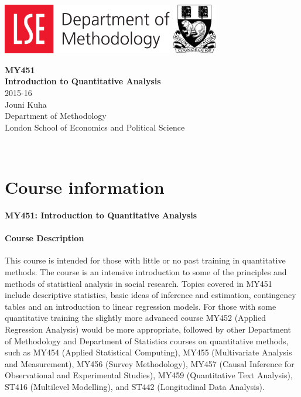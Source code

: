 \frontmatter
\thispagestyle{empty}

\includegraphics[height=2.2cm]{dept_of_methodology}
\hfill
\includegraphics[height=2.2cm]{lse}


\begin{center}
{\LARGE \textbf{MY451}}\\{\LARGE \textbf{Introduction to Quantitative Analysis}}
\\
{\Large 2015-16}\\
{\Large Jouni Kuha}\\{\Large Department of Methodology}\\{\Large London School of Economics and
Political Science}
\end{center}

\newpage
\thispagestyle{empty}

$\, $
\newpage
\setcounter{page}{1}


\chapter{Course information}


{\Large \textbf{MY451: Introduction to Quantitative Analysis}}


\subsubsection{Course Description}
This course is intended for those with little or no past training in
quantitative methods.  The course is an intensive introduction to some
of the principles and methods of statistical analysis in social
research.
Topics covered in MY451 include descriptive statistics, basic ideas of
inference and estimation, contingency tables and an introduction to
linear regression models.
For those with some quantitative training the slightly more
advanced course MY452 (Applied Regression Analysis) would be more
appropriate, followed by other Department of Methodology and Department
of Statistics courses on quantitative methods, such as MY454 (Applied Statistical Computing), MY455 (Multivariate Analysis and
Measurement), MY456 (Survey Methodology), MY457 (Causal Inference for
Observational and Experimental Studies),
MY459 (Quantitative Text Analysis),
ST416 (Multilevel Modelling), and ST442 (Longitudinal Data Analysis).

